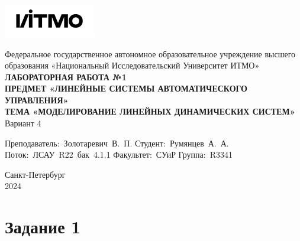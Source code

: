 \documentclass[a4paper, 12pt]{article}
\begin{document}
    \begin{titlepage}

        \begin{center}
        \includegraphics[width=0.3\textwidth]{itmo.png} %
        \vfill
        
        Федеральное государственное автономное образовательное учреждение высшего образования
        «Национальный Исследовательский Университет ИТМО»\\
        
        \vfill
        {\large\bf ЛАБОРАТОРНАЯ РАБОТА №1}\\
        {\large\bf ПРЕДМЕТ «ЛИНЕЙНЫЕ СИСТЕМЫ АВТОМАТИЧЕСКОГО УПРАВЛЕНИЯ»}\\
        {\large\bf ТЕМА «МОДЕЛИРОВАНИЕ ЛИНЕЙНЫХ ДИНАМИЧЕСКИХ СИСТЕМ»}\\
        Вариант 4
        \vfill

        \begin{flushright}
            \begin{minipage}{.45\textwidth}
            {
                \hbox{Преподаватель: Золотаревич В. П.}
                \hbox{Студент: Румянцев А. А.}
                \hbox{Поток: ЛСАУ R22 бак 4.1.1}
                \hbox{}
                \hbox{Факультет: СУиР}
                \hbox{Группа: R3341}
            }
            \end{minipage}
        \end{flushright}
        
        \vfill
                
        Санкт-Петербург\\
        2024
        \end{center}
    \end{titlepage}
    
    \tableofcontents

    \newpage
    \section{Задание 1}
\end{document}
